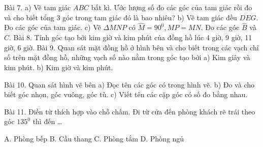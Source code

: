 Bài 7. 
a) Vẽ tam giác $ABC$ bất kì. Ước lượng số đo các góc của tam giác rồi đo và cho biết tổng 3 góc trong tam giác đó là bao nhiêu?
b) Vẽ tam giác đều $DEG$. Đo các góc của tam giác.
c) Vẽ $\Delta MNP$ có $\widehat{M}={{90}^{0}},MP=MN$. Đo các góc $\widehat{B}$ và $\widehat{C}$.
Bài 8. Tính góc tạo bởi kim giờ và kim phút của đồng hồ lúc 4 giờ, 9 giờ, 11 giờ, 6 giờ.
Bài 9. Quan sát mặt đồng hồ ở hình bên và cho biết trong các vạch chỉ số trên mặt đồng hồ, những vạch số nào nằm trong góc tạo bởi
a) Kim giây và kim phút.
b) Kim giờ và kim phút.

Bài 10. Quan sát hình vẽ bên
a) Đọc tên các góc có trong hình vẽ.
b) Đo và cho biết góc nhọn, góc vuông, góc tù.
c) Viết tên các cặp góc có số đo bằng nhau.

Bài 11. Điền từ thích hợp vào chỗ chấm. Đi từ cửa đến phòng khách rẽ trái theo góc ${{135}^{0}}$ thì đến …



A. Phòng bếp	B. Cầu thang	C. Phòng tắm	D. Phòng ngủ

